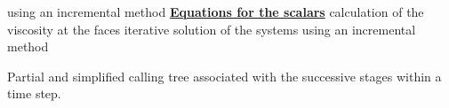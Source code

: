 \begin{table}[htp]
using an incremental method\newline
\underline{\textbf{Equations for the scalars}}\newline
\hspace*{1cm}\newline
\hspace*{1,5cm} \hspace*{1cm}calculation of the viscosity at
the faces\newline
\hspace*{1,5cm} \hspace*{1cm}iterative solution of the systems
using an incremental method\newline
\caption{Partial and simplified calling tree associated with the successive
stages within a time step.}
\label{Base_Introd_simple_calling_tree}
\end{table}
